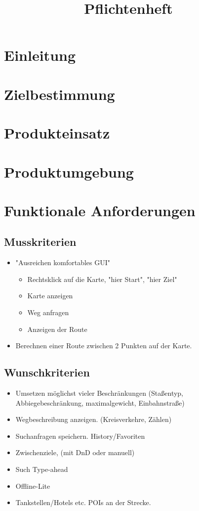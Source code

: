 \documentclass[a4paper, 11pt]{article}
\title{Pflichtenheft}
\begin{document}

\maketitle
\newpage
\tableofcontents
\newpage


\section{Einleitung}

\section{Zielbestimmung}

\section{Produkteinsatz}

\section{Produktumgebung}

\section{Funktionale Anforderungen}

\subsection{Musskriterien}
\begin{itemize}
\item "Ausreichen komfortables GUI"
\begin{itemize}
\item Rechtsklick auf die Karte, "hier Start", "hier Ziel"
\item Karte anzeigen
\item Weg anfragen
\item Anzeigen der Route
\end{itemize}
\item Berechnen einer Route zwischen 2 Punkten auf der Karte.
\end{itemize}
\subsection{Wunschkriterien}
\begin{itemize}
\item Umsetzen möglichst vieler Beschränkungen (Staßentyp, Abbiegebeschränkung, maximalgewicht, Einbahnstraße)

\item Wegbeschreibung anzeigen. (Kreisverkehre, Zählen)

\item Suchanfragen speichern. History/Favoriten
\item Zwischenziele, (mit DnD oder manuell)
\item Such Type-ahead
\item Offline-Lite

\item Tankstellen/Hotels etc. POIs an der Strecke.
\end{itemize}
\end{document}
